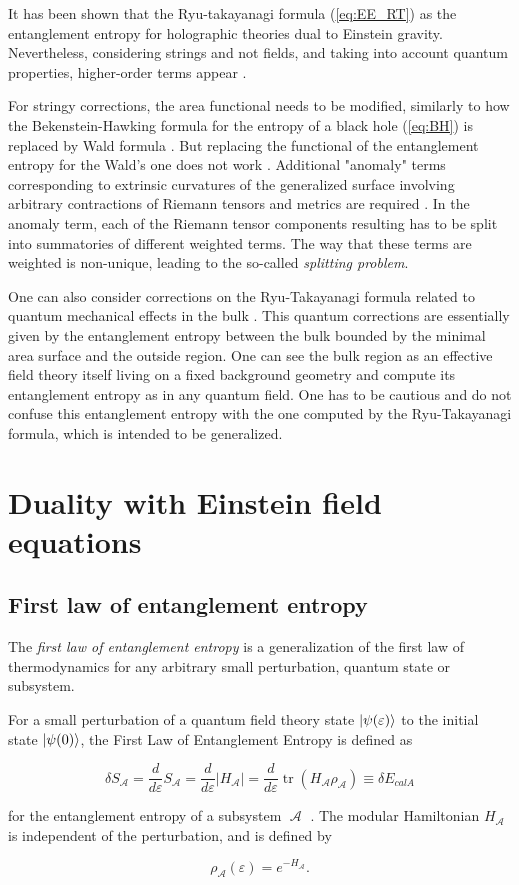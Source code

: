 \documentclass[twocolumn]{revtex4}
\providecommand{\abs}[1]{\lvert#1\rvert}
\providecommand{\eq}[2]{
    \begin{equation}
        #2
    \label{eq:#1}
    \end{equation}
}
\DeclareMathOperator{\calA}{\mathcal{A}}
\DeclareMathOperator{\tr}{tr}
\begin{document}
It has been shown that the Ryu-takayanagi formula (\ref{eq:EE_RT}) as the entanglement entropy for holographic theories dual to Einstein gravity. Nevertheless, considering strings and not fields, and taking into account quantum properties, higher-order terms appear \cite{bueno_holographic_2021}.

For stringy corrections, the area functional needs to be modified, similarly to how the Bekenstein-Hawking formula for the entropy of a black hole (\ref{eq:BH}) is replaced by Wald formula \cite{iyer_properties_1994}. But replacing the functional of the entanglement entropy for the Wald's one does not work \cite{bueno_holographic_2021}. Additional "anomaly" terms corresponding to extrinsic curvatures of the generalized surface involving arbitrary contractions of Riemann tensors and metrics are required \cite{dong_holographic_2014}. In the anomaly term, each of the Riemann tensor components resulting has to be split into summatories of different weighted terms. The way that these terms are weighted is non-unique, leading to the so-called \textit{splitting problem}.

One can also consider corrections on the Ryu-Takayanagi formula related to quantum mechanical effects in the bulk \cite{faulkner_quantum_2013}. This quantum corrections are essentially given by the entanglement entropy between the bulk bounded by the minimal area surface and the outside region. One can see the bulk region as an effective field theory itself living on a fixed background geometry and compute its entanglement entropy as in any quantum field. One has to be cautious and do not confuse this entanglement entropy with the one computed by the Ryu-Takayanagi formula, which is intended to be generalized.


\section{Duality with Einstein field equations} \label{s:EQ}


\subsection{First law of entanglement entropy} \label{ss:FLEE}

The \textit{first law of entanglement entropy} is a generalization of the first law of thermodynamics for any arbitrary small perturbation, quantum state or subsystem.

For a small perturbation of a quantum field theory state $\ket{\psi(\varepsilon)}$ to the initial state $\ket{\psi(0)}$, the First Law of Entanglement Entropy is defined as
\eq{FLEE}{
    \delta S_{\calA} = \frac{d}{d \varepsilon} S_{\calA} = \frac{d}{d \varepsilon} \abs{H_{\calA}} = \frac{d}{d \varepsilon} \tr (H_{\calA} \rho_{\calA}) \equiv \delta E_{calA}
}
for the entanglement entropy of a subsystem $\calA$ \cite{fareghbal_first_2019}. The modular Hamiltonian $H_{\calA}$ is independent of the perturbation, and is defined by
\eq{modularH}{
    \rho_{\calA} (\varepsilon) = e^{-H_{\calA}}.
}
\end{document}

